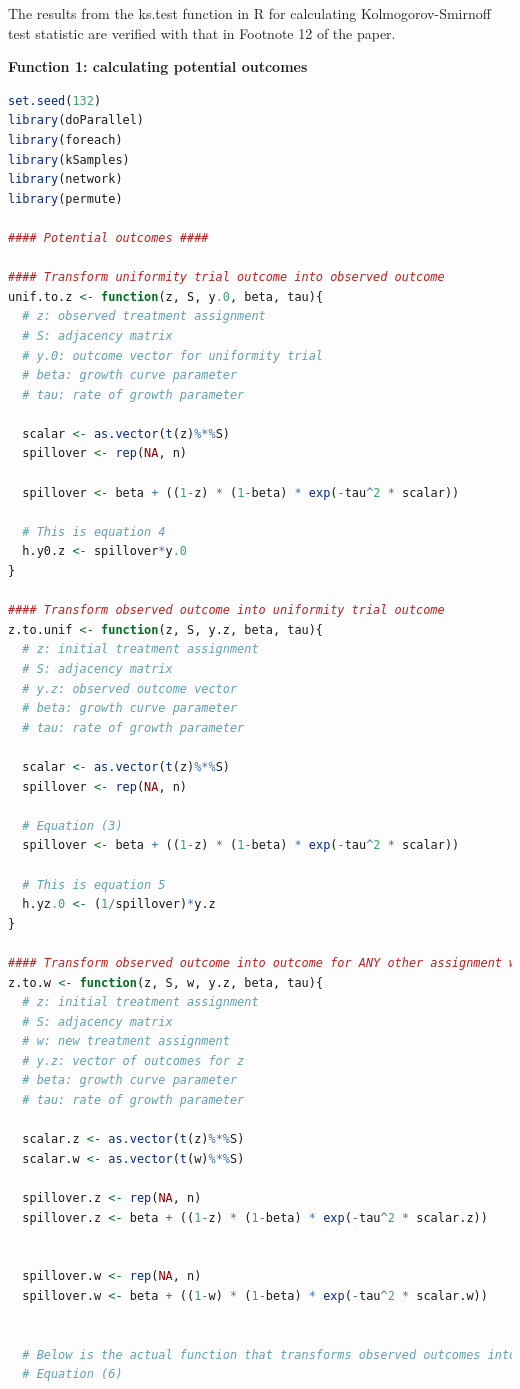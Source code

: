 \documentclass[12pt]{article}
\begin{document}
The results from the ks.test function in R for calculating Kolmogorov-Smirnoff test statistic are verified with that in Footnote 12 of the paper.


\textbf{Function 1: calculating potential outcomes}

\begin{lstlisting}[language=R]
set.seed(132)
library(doParallel)
library(foreach)
library(kSamples)
library(network)
library(permute)

#### Potential outcomes ####

#### Transform uniformity trial outcome into observed outcome
unif.to.z <- function(z, S, y.0, beta, tau){
  # z: observed treatment assignment
  # S: adjacency matrix
  # y.0: outcome vector for uniformity trial
  # beta: growth curve parameter
  # tau: rate of growth parameter
  
  scalar <- as.vector(t(z)%*%S)
  spillover <- rep(NA, n)
  
  spillover <- beta + ((1-z) * (1-beta) * exp(-tau^2 * scalar))
  
  # This is equation 4
  h.y0.z <- spillover*y.0
}

#### Transform observed outcome into uniformity trial outcome
z.to.unif <- function(z, S, y.z, beta, tau){
  # z: initial treatment assignment
  # S: adjacency matrix
  # y.z: observed outcome vector
  # beta: growth curve parameter
  # tau: rate of growth parameter

  scalar <- as.vector(t(z)%*%S)
  spillover <- rep(NA, n)
  
  # Equation (3)
  spillover <- beta + ((1-z) * (1-beta) * exp(-tau^2 * scalar))
  
  # This is equation 5
  h.yz.0 <- (1/spillover)*y.z
}

#### Transform observed outcome into outcome for ANY other assignment w
z.to.w <- function(z, S, w, y.z, beta, tau){
  # z: initial treatment assignment
  # S: adjacency matrix
  # w: new treatment assignment
  # y.z: vector of outcomes for z
  # beta: growth curve parameter
  # tau: rate of growth parameter
  
  scalar.z <- as.vector(t(z)%*%S)
  scalar.w <- as.vector(t(w)%*%S)
  
  spillover.z <- rep(NA, n)
  spillover.z <- beta + ((1-z) * (1-beta) * exp(-tau^2 * scalar.z))
  
  
  spillover.w <- rep(NA, n)
  spillover.w <- beta + ((1-w) * (1-beta) * exp(-tau^2 * scalar.w))
  
  
  # Below is the actual function that transforms observed outcomes into potential outcomes
  # Equation (6)
  

\end{lstlisting}
\end{document}
